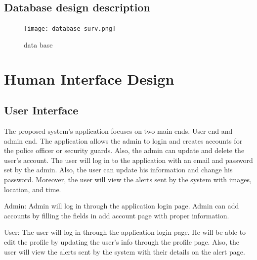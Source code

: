 \documentclass[12pt]{article}
\begin{document}
\subsection{Database design description}

\begin{figure}[h]
  \centering
  \texttt{[image: database surv.png]}
  \label{fig:2}
   \caption{data base}
\end{figure}
\FloatBarrier

\section{Human Interface Design}
\label{hid}
\subsection {User Interface}
The proposed system's application focuses on two main ends. User end and admin end. The application allows the admin to login and creates accounts for the police officer or security guards. Also, the admin can update and delete the user's account. The user will log in to the application with an email and password set by the admin. Also, the user can update his information and change his password. Moreover, the user will view the alerts sent by the system with images, location, and time.

Admin: Admin will log in through the application login page. Admin can add accounts by filling the fields in add account page with proper information.

User: The user will log in through the application login page. He will be able to edit the profile by updating the user's info through the profile page. Also, the user will view the alerts sent by the system with their details on the alert page.
\end{document}
